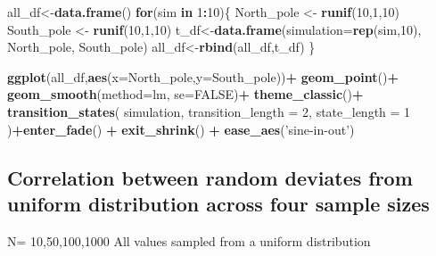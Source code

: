 \documentclass[]{book}
\newenvironment{Shaded}{\begin{snugshade}}{\end{snugshade}}
\newcommand{\ControlFlowTok}[1]{\textcolor[rgb]{0.13,0.29,0.53}{\textbf{#1}}}
\newcommand{\DataTypeTok}[1]{\textcolor[rgb]{0.13,0.29,0.53}{#1}}
\newcommand{\DecValTok}[1]{\textcolor[rgb]{0.00,0.00,0.81}{#1}}
\newcommand{\KeywordTok}[1]{\textcolor[rgb]{0.13,0.29,0.53}{\textbf{#1}}}
\newcommand{\NormalTok}[1]{#1}
\newcommand{\OperatorTok}[1]{\textcolor[rgb]{0.81,0.36,0.00}{\textbf{#1}}}
\newcommand{\OtherTok}[1]{\textcolor[rgb]{0.56,0.35,0.01}{#1}}
\newcommand{\StringTok}[1]{\textcolor[rgb]{0.31,0.60,0.02}{#1}}
\begin{document}
\begin{Shaded}
\begin{Highlighting}[]
\NormalTok{all_df<-}\KeywordTok{data.frame}\NormalTok{()}
\ControlFlowTok{for}\NormalTok{(sim }\ControlFlowTok{in} \DecValTok{1}\OperatorTok{:}\DecValTok{10}\NormalTok{)\{}
\NormalTok{  North_pole <-}\StringTok{ }\KeywordTok{runif}\NormalTok{(}\DecValTok{10}\NormalTok{,}\DecValTok{1}\NormalTok{,}\DecValTok{10}\NormalTok{)}
\NormalTok{  South_pole <-}\StringTok{ }\KeywordTok{runif}\NormalTok{(}\DecValTok{10}\NormalTok{,}\DecValTok{1}\NormalTok{,}\DecValTok{10}\NormalTok{)}
\NormalTok{  t_df<-}\KeywordTok{data.frame}\NormalTok{(}\DataTypeTok{simulation=}\KeywordTok{rep}\NormalTok{(sim,}\DecValTok{10}\NormalTok{),}
\NormalTok{                                  North_pole,}
\NormalTok{                                  South_pole)}
\NormalTok{  all_df<-}\KeywordTok{rbind}\NormalTok{(all_df,t_df)}
\NormalTok{\}}


\KeywordTok{ggplot}\NormalTok{(all_df,}\KeywordTok{aes}\NormalTok{(}\DataTypeTok{x=}\NormalTok{North_pole,}\DataTypeTok{y=}\NormalTok{South_pole))}\OperatorTok{+}
\StringTok{  }\KeywordTok{geom_point}\NormalTok{()}\OperatorTok{+}
\StringTok{  }\KeywordTok{geom_smooth}\NormalTok{(}\DataTypeTok{method=}\NormalTok{lm, }\DataTypeTok{se=}\OtherTok{FALSE}\NormalTok{)}\OperatorTok{+}
\StringTok{  }\KeywordTok{theme_classic}\NormalTok{()}\OperatorTok{+}
\StringTok{  }\KeywordTok{transition_states}\NormalTok{(}
\NormalTok{    simulation,}
    \DataTypeTok{transition_length =} \DecValTok{2}\NormalTok{,}
    \DataTypeTok{state_length =} \DecValTok{1}
\NormalTok{  )}\OperatorTok{+}\KeywordTok{enter_fade}\NormalTok{() }\OperatorTok{+}\StringTok{ }
\StringTok{  }\KeywordTok{exit_shrink}\NormalTok{() }\OperatorTok{+}
\StringTok{  }\KeywordTok{ease_aes}\NormalTok{(}\StringTok{'sine-in-out'}\NormalTok{)}
\end{Highlighting}
\end{Shaded}

\hypertarget{correlation-between-random-deviates-from-uniform-distribution-across-four-sample-sizes}{%
\subsection{Correlation between random deviates from uniform distribution across four sample sizes}\label{correlation-between-random-deviates-from-uniform-distribution-across-four-sample-sizes}}

N= 10,50,100,1000
All values sampled from a uniform distribution
\end{document}
